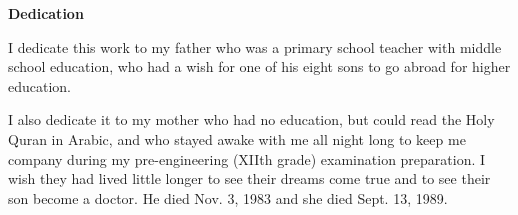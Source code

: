 \newpage
\begin{center}
{\Large \bf Dedication}
\end{center}
\vspace*{0.2in}

 I dedicate this work to my father who was a primary school teacher
with middle school education, who had a wish for one of his eight sons
to go abroad for higher education.

 I also dedicate it to my mother who had no education, but could read
the Holy Quran in Arabic, and who stayed awake with me all night long
to keep me company during my pre-engineering (XIIth grade) examination
preparation. I wish they had lived little longer to see their dreams
come true and to see their son become a doctor. He died Nov. 3, 1983
and she died Sept. 13, 1989.
